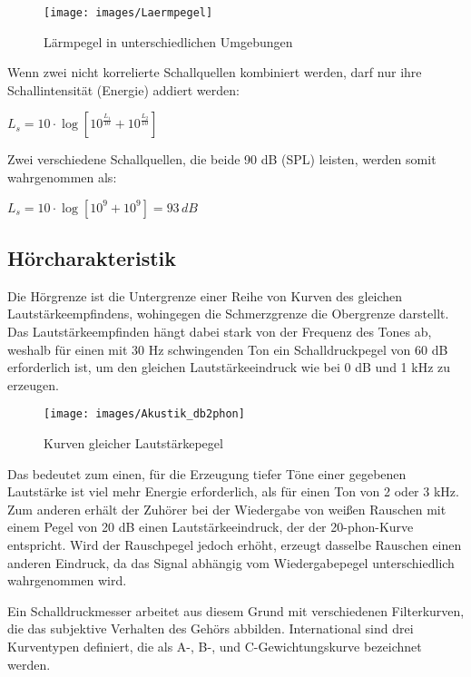 \begin{figure}[H]
\centering
\texttt{[image: images/Laermpegel]}
\caption{Lärmpegel in unterschiedlichen Umgebungen}
\label{fig:Laermpegel}
\end{figure}

Wenn zwei nicht korrelierte Schallquellen kombiniert werden, darf nur ihre Schallintensität (Energie) addiert werden:
\begin{center}
$L_s = 10\cdot\log[10^{\frac{L_1}{10}}+10^{\frac{L_2}{10}}]$
\end{center}
Zwei verschiedene Schallquellen, die beide 90 dB (SPL) leisten, werden somit wahrgenommen als:
\begin{center}
$L_s = 10\cdot\log[10^9+10^9] = 93\,dB$
\end{center}

\subsection{Hörcharakteristik} 
\label{sub:Hoercharakteristik}
Die Hörgrenze ist die Untergrenze einer Reihe von Kurven des gleichen Lautstärkeempfindens, wohingegen die Schmerzgrenze die Obergrenze darstellt. Das Lautstärkeempfinden hängt dabei stark von der Frequenz des Tones ab, weshalb für einen mit 30 Hz schwingenden Ton ein Schalldruckpegel von 60 dB erforderlich ist, um den gleichen Lautstärkeeindruck wie bei 0 dB und 1 kHz zu erzeugen.

\begin{figure}[H]
\centering
\texttt{[image: images/Akustik\_db2phon]}
\caption{Kurven gleicher Lautstärkepegel}
\label{fig:Lautstaerkewahrnehmung}
\end{figure}

Das bedeutet zum einen, für die Erzeugung tiefer Töne einer gegebenen Lautstärke ist viel mehr Energie erforderlich, als für einen Ton von 2 oder 3 kHz. Zum anderen erhält der Zuhörer bei der Wiedergabe von weißen Rauschen mit einem Pegel von 20 dB einen Lautstärkeeindruck, der der 20-phon-Kurve entspricht. Wird der Rauschpegel jedoch erhöht, erzeugt dasselbe Rauschen einen anderen Eindruck, da das Signal abhängig vom Wiedergabepegel unterschiedlich wahrgenommen wird.

Ein Schalldruckmesser arbeitet aus diesem Grund mit verschiedenen Filterkurven, die das subjektive Verhalten des Gehörs abbilden. International sind drei Kurventypen definiert, die als A-, B-, und C-Gewichtungskurve bezeichnet werden. 

